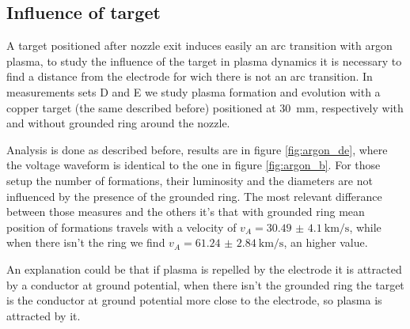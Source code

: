 \subsection{Influence of target}
A target positioned after nozzle exit induces easily an arc transition with argon plasma, to study the influence of the target in plasma dynamics it is necessary to find a distance from the electrode for wich there is not an arc transition. In measurements sets D and E we study plasma formation and evolution with a copper target (the same described before) positioned at \SI{30}{\milli\meter}, respectively with and without grounded ring around the nozzle.


Analysis is done as described before, results are in figure \ref{fig:argon_de}, where the voltage waveform is identical to the one in figure \ref{fig:argon_b}.
For those setup the number of formations, their luminosity and the diameters are not influenced by the presence of the grounded ring.
The most relevant differance between those measures and the others it's that with grounded ring mean position of formations travels with a velocity of $v_A = \SI{30.49(410)}{\kilo\meter/\second}$, while when there isn't the ring we find $v_A = \SI{61.24(284)}{\kilo\meter/\second}$, an higher value.

An explanation could be that if plasma is repelled by the electrode it is attracted by a conductor at ground potential, when there isn't the grounded ring the target is the conductor at ground potential more close to the electrode, so plasma is attracted by it.

